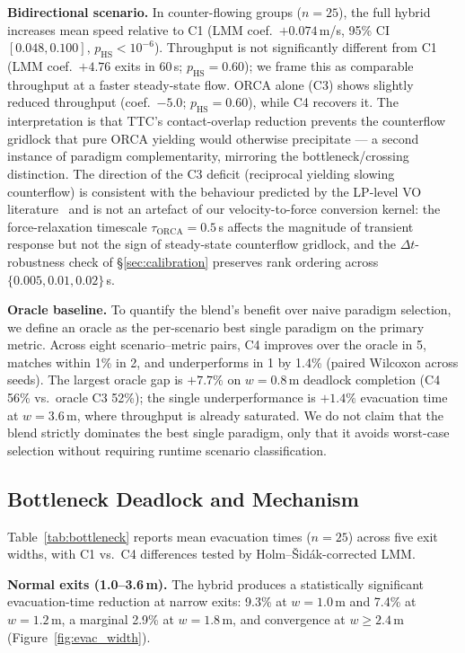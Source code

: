 \documentclass[a4paper,twoside]{article}
\begin{document}
\textbf{Bidirectional scenario.}
In counter-flowing groups ($n=25$), the full hybrid increases mean speed relative to C1 (LMM coef.\ $+0.074$\,m/s, 95\% CI $[0.048,0.100]$, $p_{\mathrm{HS}}\!<\!10^{-6}$). Throughput is not significantly different from C1 (LMM coef.\ $+4.76$ exits in 60\,s; $p_{\mathrm{HS}}{=}0.60$); we frame this as comparable throughput at a faster steady-state flow. ORCA alone (C3) shows slightly reduced throughput (coef.\ $-5.0$; $p_{\mathrm{HS}}{=}0.60$), while C4 recovers it. The interpretation is that TTC's contact-overlap reduction prevents the counterflow gridlock that pure ORCA yielding would otherwise precipitate --- a second instance of paradigm complementarity, mirroring the bottleneck/crossing distinction. The direction of the C3 deficit (reciprocal yielding slowing counterflow) is consistent with the behaviour predicted by the LP-level VO literature~\cite{VandenBerg11} and is not an artefact of our velocity-to-force conversion kernel: the force-relaxation timescale $\tau_{\text{ORCA}}{=}0.5$\,s affects the magnitude of transient response but not the sign of steady-state counterflow gridlock, and the $\Delta t$-robustness check of \S\ref{sec:calibration} preserves rank ordering across $\{0.005,0.01,0.02\}$\,s.

\textbf{Oracle baseline.}
To quantify the blend's benefit over naive paradigm selection, we define an oracle as the per-scenario best single paradigm on the primary metric. Across eight scenario--metric pairs, C4 improves over the oracle in 5, matches within 1\% in 2, and underperforms in 1 by 1.4\% (paired Wilcoxon across seeds). The largest oracle gap is $+7.7\%$ on $w=0.8$\,m deadlock completion (C4 56\% vs.\ oracle C3 52\%); the single underperformance is $+1.4\%$ evacuation time at $w=3.6$\,m, where throughput is already saturated. We do not claim that the blend strictly dominates the best single paradigm, only that it avoids worst-case selection without requiring runtime scenario classification.

\subsection{Bottleneck Deadlock and Mechanism}
\label{sec:bottleneck-evac}

Table~\ref{tab:bottleneck} reports mean evacuation times ($n=25$) across five exit widths, with C1 vs.\ C4 differences tested by Holm--\v{S}id\'ak-corrected LMM.

\textbf{Normal exits (1.0--3.6\,m).} The hybrid produces a statistically significant evacuation-time reduction at narrow exits: 9.3\% at $w=1.0$\,m and 7.4\% at $w=1.2$\,m, a marginal 2.9\% at $w=1.8$\,m, and convergence at $w\!\ge\!2.4$\,m (Figure~\ref{fig:evac_width}).
\end{document}
